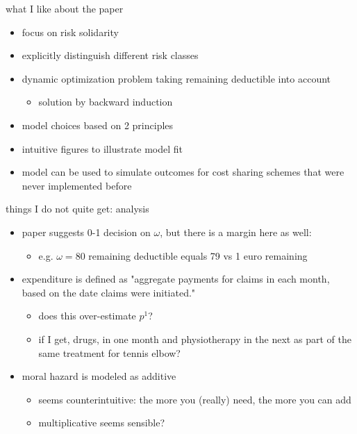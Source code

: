 \documentclass[presentation]{beamer}
\begin{document}
\begin{frame}[label={sec:org62da66d}]{what I like about the paper}
\begin{itemize}
\item focus on risk solidarity
\item explicitly distinguish different risk classes
\item dynamic optimization problem taking remaining deductible into account
\begin{itemize}
\item solution by backward induction
\end{itemize}
\item model choices based on 2 principles
\item intuitive figures to illustrate model fit
\item model can be used to simulate outcomes for cost sharing schemes that were never implemented before
\end{itemize}
\end{frame}


\begin{frame}[label={sec:org02b6434}]{things I do not quite get: analysis}
\begin{itemize}
\item paper suggests 0-1 decision on \(\omega\), but there is a margin here as well:
\begin{itemize}
\item e.g. \(\omega=80\) remaining deductible equals 79 vs 1 euro remaining
\end{itemize}
\item expenditure is defined as "aggregate payments for claims in each month, based on the date claims were initiated."
\begin{itemize}
\item does this over-estimate \(p^1\)?
\item if I get, drugs, in one month and physiotherapy in the next as part of the same treatment for tennis elbow?
\end{itemize}
\item moral hazard is modeled as additive
\begin{itemize}
\item seems counterintuitive: the more you (really) need, the more you can add
\item multiplicative seems sensible?
\end{itemize}
\end{itemize}
\end{frame}
\end{document}
